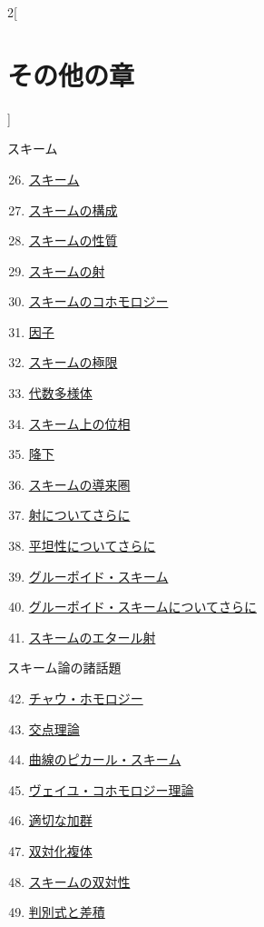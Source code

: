 \begin{multicols}{2}[\section{その他の章}]
\begin{enumerate}
\end{enumerate}
スキーム
\begin{enumerate}
\setcounter{enumi}{25}
\item \hyperref[schemes-section-phantom]{スキーム}
\item \hyperref[constructions-section-phantom]{スキームの構成}
\item \hyperref[properties-section-phantom]{スキームの性質}
\item \hyperref[morphisms-section-phantom]{スキームの射}
\item \hyperref[coherent-section-phantom]{スキームのコホモロジー}
\item \hyperref[divisors-section-phantom]{因子}
\item \hyperref[limits-section-phantom]{スキームの極限}
\item \hyperref[varieties-section-phantom]{代数多様体}
\item \hyperref[topologies-section-phantom]{スキーム上の位相}
\item \hyperref[descent-section-phantom]{降下}
\item \hyperref[perfect-section-phantom]{スキームの導来圏}
\item \hyperref[more-morphisms-section-phantom]{射についてさらに}
\item \hyperref[flat-section-phantom]{平坦性についてさらに}
\item \hyperref[groupoids-section-phantom]{グルーポイド・スキーム}
\item \hyperref[more-groupoids-section-phantom]{グルーポイド・スキームについてさらに}
\item \hyperref[etale-section-phantom]{スキームのエタール射}
\end{enumerate}
スキーム論の諸話題
\begin{enumerate}
\setcounter{enumi}{41}
\item \hyperref[chow-section-phantom]{チャウ・ホモロジー}
\item \hyperref[intersection-section-phantom]{交点理論}
\item \hyperref[pic-section-phantom]{曲線のピカール・スキーム}
\item \hyperref[weil-section-phantom]{ヴェイユ・コホモロジー理論}
\item \hyperref[adequate-section-phantom]{適切な加群}
\item \hyperref[dualizing-section-phantom]{双対化複体}
\item \hyperref[duality-section-phantom]{スキームの双対性}
\item \hyperref[discriminant-section-phantom]{判別式と差積}

\end{enumerate}
\end{multicols}
